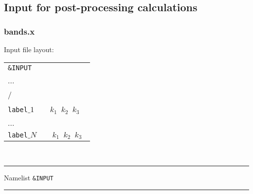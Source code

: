 \subsection{Input for post-processing calculations}
\subsubsection{bands.x}
\noindent Input file layout: \\

%
%
\begin{tabular}{l}
 {\tt \&INPUT} \\
   ... \\
   / \\
  \\
 {\tt label$\_1$ $\quad$ $k_1$ $k_2$ $k_3$ } \\
  ... \\
 {\tt label$\_N$ $\quad$ $k_1$ $k_2$ $k_3$ } \\
\end{tabular}
%
%
\\

\begin{centering}
\rule{2.2in}{0.01in} Namelist {\tt \&INPUT} \rule{2.2in}{0.01in}
\end{centering}\\

